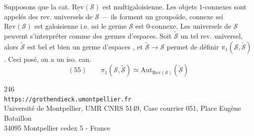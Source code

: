 Supposons   que la cat. $\underline{\mathrm{Rev}}(\mathcal S)$ est  multigaloisienne. Les objets $1$-connexes sont appelés des rev. universels de $\mathcal S$ ---  ils forment un groupoïde, connexe ssi $\underline{\mathrm{Rev}}(\mathcal S)$ est galoisienne i.e. ssi le germe $\mathcal S$ est $0$-connexe. Les  universels de $\mathcal S$ peuvent s'interpréter comme des germes d'espaces. Soit $\widetilde{\mathcal S}$ un tel rev. universel, alors $\widetilde{\mathcal S}$ est bel et bien un germe d'espaces , et $\widetilde{\mathcal S}\longrightarrow\mathcal S$ permet de définir $\pi_1(\mathcal S,\widetilde{\mathcal S})$. Ceci posé, on a un iso. can.
\[
(55)\qquad \pi_1(\mathcal S,\widetilde{\mathcal S})\simeq\mathrm{Aut}_{\underline{\mathrm{Rev}}(\mathcal S)}(\widetilde{\mathcal S})
\]




\begin{center}
246\\
\texttt{https://grothendieck.umontpellier.fr}\\
Université de Montpellier, UMR CNRS 5149, Case courrier 051, Place Eugène Bataillon\\
34095 Montpellier cedex 5 - France
\end{center}
